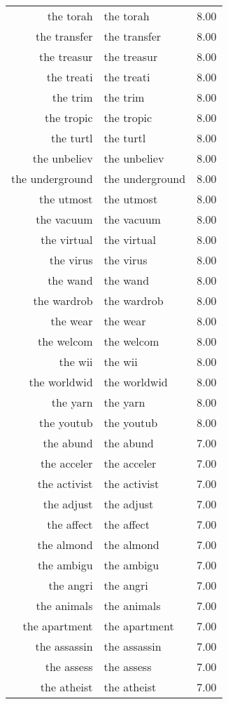\begin{table}[ht]
\begin{tabular}{rlr}
  the torah & the torah & 8.00 \\ 
  the transfer & the transfer & 8.00 \\ 
  the treasur & the treasur & 8.00 \\ 
  the treati & the treati & 8.00 \\ 
  the trim & the trim & 8.00 \\ 
  the tropic & the tropic & 8.00 \\ 
  the turtl & the turtl & 8.00 \\ 
  the unbeliev & the unbeliev & 8.00 \\ 
  the underground & the underground & 8.00 \\ 
  the utmost & the utmost & 8.00 \\ 
  the vacuum & the vacuum & 8.00 \\ 
  the virtual & the virtual & 8.00 \\ 
  the virus & the virus & 8.00 \\ 
  the wand & the wand & 8.00 \\ 
  the wardrob & the wardrob & 8.00 \\ 
  the wear & the wear & 8.00 \\ 
  the welcom & the welcom & 8.00 \\ 
  the wii & the wii & 8.00 \\ 
  the worldwid & the worldwid & 8.00 \\ 
  the yarn & the yarn & 8.00 \\ 
  the youtub & the youtub & 8.00 \\ 
  the abund & the abund & 7.00 \\ 
  the acceler & the acceler & 7.00 \\ 
  the activist & the activist & 7.00 \\ 
  the adjust & the adjust & 7.00 \\ 
  the affect & the affect & 7.00 \\ 
  the almond & the almond & 7.00 \\ 
  the ambigu & the ambigu & 7.00 \\ 
  the angri & the angri & 7.00 \\ 
  the animals & the animals & 7.00 \\ 
  the apartment & the apartment & 7.00 \\ 
  the assassin & the assassin & 7.00 \\ 
  the assess & the assess & 7.00 \\ 
  the atheist & the atheist & 7.00 \\ 

\end{tabular}
\end{table}
